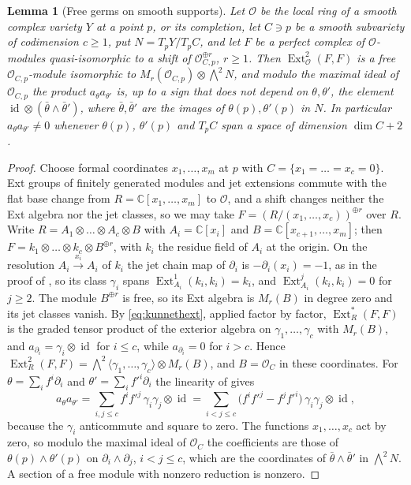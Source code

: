 \documentclass[11pt,reqno]{amsart}
\theoremstyle{plain}
\newtheorem{lemma}[theorem]{Lemma}
\theoremstyle{definition}
\theoremstyle{remark}
\newcommand{\CC}{\mathbb{C}}
\newcommand{\cO}{\mathcal{O}}
\DeclareMathOperator{\Ext}{Ext}
\DeclareMathOperator{\id}{id}
\begin{document}
\begin{lemma}[Free germs on smooth supports]\label{lem:freegerm}
Let $\cO$ be the local ring of a smooth complex variety $Y$ at a point $p$,
or its completion, let $C\ni p$ be a smooth subvariety of codimension
$c\ge1$, put $N=T_{p}Y/T_{p}C$, and let $F$ be a perfect complex of
$\cO$-modules quasi-isomorphic to a shift of $\cO_{C,p}^{\oplus r}$, $r\ge1$.
Then $\Ext^{2}_{\cO}(F,F)$ is a free $\cO_{C,p}$-module isomorphic to
$M_{r}(\cO_{C,p})\otimes\bigwedge^{2}N$, and modulo the maximal ideal of
$\cO_{C,p}$ the product $a_{\theta}a_{\theta'}$ is, up to a sign that does
not depend on $\theta,\theta'$, the element $\id\otimes(\bar\theta\wedge\bar\theta')$,
where $\bar\theta,\bar\theta'$ are the images of $\theta(p),\theta'(p)$ in
$N$. In particular $a_{\theta}a_{\theta'}\ne0$ whenever $\theta(p)$,
$\theta'(p)$ and $T_{p}C$ span a space of dimension $\dim C+2$.
\end{lemma}

\begin{proof}
Choose formal coordinates $x_{1},\dots,x_{m}$ at $p$ with
$C=\{x_{1}=\dots=x_{c}=0\}$. Ext groups of finitely generated modules and jet
extensions commute with the flat base change from
$R=\CC[x_{1},\dots,x_{m}]$ to $\cO$, and a shift changes neither the Ext
algebra nor the jet classes, so we may take $F=(R/(x_{1},\dots,x_{c}))^{\oplus r}$
over $R$. Write $R=A_{1}\otimes\dots\otimes A_{c}\otimes B$ with
$A_{i}=\CC[x_{i}]$ and $B=\CC[x_{c+1},\dots,x_{m}]$; then
$F=k_{1}\otimes\dots\otimes k_{c}\otimes B^{\oplus r}$, with $k_{i}$ the
residue field of $A_{i}$ at the origin. On the resolution
$A_{i}\xrightarrow{x_{i}}A_{i}$ of $k_{i}$ the jet chain map of
$\partial_{i}$ is $-\partial_{i}(x_{i})=-1$, as in the proof of
, so its class $\gamma_{i}$ spans
$\Ext^{1}_{A_{i}}(k_{i},k_{i})=k_{i}$, and $\Ext^{j}_{A_{i}}(k_{i},k_{i})=0$ for
$j\ge2$. The module $B^{\oplus r}$ is free, so its Ext algebra is
$M_{r}(B)$ in degree zero and its jet classes vanish. By
\eqref{eq:kunnethext}, applied factor by factor, $\Ext^{*}_{R}(F,F)$ is the
graded tensor product of the exterior algebra on $\gamma_{1},\dots,\gamma_{c}$
with $M_{r}(B)$, and $a_{\partial_{i}}=\gamma_{i}\otimes\id$ for $i\le c$,
while $a_{\partial_{i}}=0$ for $i>c$. Hence
$\Ext^{2}_{R}(F,F)=\bigwedge^{2}\langle\gamma_{1},\dots,\gamma_{c}\rangle\otimes M_{r}(B)$,
and $B=\cO_{C}$ in these coordinates. For $\theta=\sum_{i}f^{i}\partial_{i}$
and $\theta'=\sum_{i}f'^{i}\partial_{i}$ the linearity of 
gives
\[
  a_{\theta}a_{\theta'}=\sum_{i,j\le c}f^{i}f'^{j}\,\gamma_{i}\gamma_{j}\otimes\id
  =\sum_{i<j\le c}\bigl(f^{i}f'^{j}-f^{j}f'^{i}\bigr)\,\gamma_{i}\gamma_{j}\otimes\id,
\]
because the $\gamma_{i}$ anticommute and square to zero. The functions
$x_{1},\dots,x_{c}$ act by zero, so modulo the maximal ideal of $\cO_{C}$ the
coefficients are those of $\theta(p)\wedge\theta'(p)$ on
$\partial_{i}\wedge\partial_{j}$, $i<j\le c$, which are the coordinates of
$\bar\theta\wedge\bar\theta'$ in $\bigwedge^{2}N$. A section of a free module
with nonzero reduction is nonzero.
\end{proof}
\end{document}
